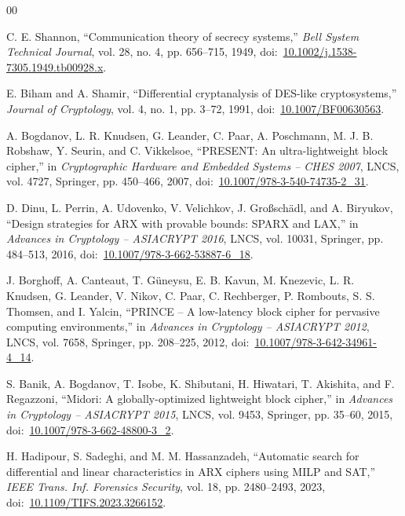 \documentclass[review,12pt]{elsarticle}
\begin{document}
\begin{thebibliography}{00}
\small
\setlength{\itemsep}{1.5pt plus 0.5pt minus 0.5pt}

C. E. Shannon, ``Communication theory of secrecy systems,'' \textit{Bell System Technical Journal}, vol. 28, no. 4, pp. 656--715, 1949, doi:~\href{https://doi.org/10.1002/j.1538-7305.1949.tb00928.x}{10.1002/j.1538-7305.1949.tb00928.x}.

E. Biham and A. Shamir, ``Differential cryptanalysis of DES-like cryptosystems,'' \textit{Journal of Cryptology}, vol. 4, no. 1, pp. 3--72, 1991, doi:~\href{https://doi.org/10.1007/BF00630563}{10.1007/BF00630563}.

A. Bogdanov, L. R. Knudsen, G. Leander, C. Paar, A. Poschmann, M. J. B. Robshaw, Y. Seurin, and C. Vikkelsoe, ``PRESENT: An ultra-lightweight block cipher,'' in \textit{Cryptographic Hardware and Embedded Systems -- CHES 2007}, LNCS, vol. 4727, Springer, pp. 450--466, 2007, doi:~\href{https://doi.org/10.1007/978-3-540-74735-2_31}{10.1007/978-3-540-74735-2\_31}.

D. Dinu, L. Perrin, A. Udovenko, V. Velichkov, J. Gro{\ss}sch\"{a}dl, and A. Biryukov, ``Design strategies for ARX with provable bounds: SPARX and LAX,'' in \textit{Advances in Cryptology -- ASIACRYPT 2016}, LNCS, vol. 10031, Springer, pp. 484--513, 2016, doi:~\href{https://doi.org/10.1007/978-3-662-53887-6_18}{10.1007/978-3-662-53887-6\_18}.

J. Borghoff, A. Canteaut, T. G\"{u}neysu, E. B. Kavun, M. Knezevic, L. R. Knudsen, G. Leander, V. Nikov, C. Paar, C. Rechberger, P. Rombouts, S. S. Thomsen, and I. Yalcin, ``PRINCE -- A low-latency block cipher for pervasive computing environments,'' in \textit{Advances in Cryptology -- ASIACRYPT 2012}, LNCS, vol. 7658, Springer, pp. 208--225, 2012, doi:~\href{https://doi.org/10.1007/978-3-642-34961-4_14}{10.1007/978-3-642-34961-4\_14}.

S. Banik, A. Bogdanov, T. Isobe, K. Shibutani, H. Hiwatari, T. Akishita, and F. Regazzoni, ``Midori: A globally-optimized lightweight block cipher,'' in \textit{Advances in Cryptology -- ASIACRYPT 2015}, LNCS, vol. 9453, Springer, pp. 35--60, 2015, doi:~\href{https://doi.org/10.1007/978-3-662-48800-3_2}{10.1007/978-3-662-48800-3\_2}.

H. Hadipour, S. Sadeghi, and M. M. Hassanzadeh, ``Automatic search for differential and linear characteristics in ARX ciphers using MILP and SAT,'' \textit{IEEE Trans. Inf. Forensics Security}, vol. 18, pp. 2480--2493, 2023, doi:~\href{https://doi.org/10.1109/TIFS.2023.3266152}{10.1109/TIFS.2023.3266152}.


\end{thebibliography}
\end{document}

